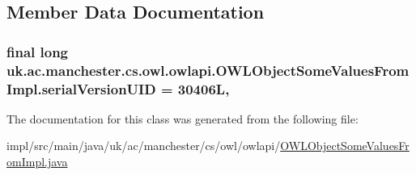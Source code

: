 \subsection{Member Data Documentation}
\hypertarget{classuk_1_1ac_1_1manchester_1_1cs_1_1owl_1_1owlapi_1_1_o_w_l_object_some_values_from_impl_a284575290e5afcd2a52fc12635dae76d}{
\subsubsection[{serial\-Version\-U\-I\-D}]{\setlength{\rightskip}{0pt plus 5cm}final long uk.\-ac.\-manchester.\-cs.\-owl.\-owlapi.\-O\-W\-L\-Object\-Some\-Values\-From\-Impl.\-serial\-Version\-U\-I\-D = 30406\-L\hspace{0.3cm}{\ttfamily [static]}, {\ttfamily [private]}}}\label{classuk_1_1ac_1_1manchester_1_1cs_1_1owl_1_1owlapi_1_1_o_w_l_object_some_values_from_impl_a284575290e5afcd2a52fc12635dae76d}


The documentation for this class was generated from the following file\-:\begin{DoxyCompactItemize}
\item 
impl/src/main/java/uk/ac/manchester/cs/owl/owlapi/\hyperlink{_o_w_l_object_some_values_from_impl_8java}{O\-W\-L\-Object\-Some\-Values\-From\-Impl.\-java}\end{DoxyCompactItemize}
